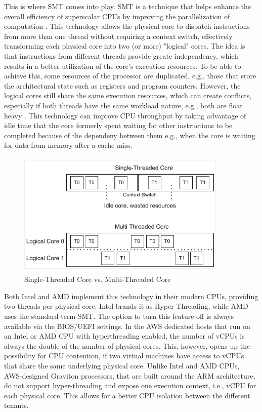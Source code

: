 \noindent
This is where \ac{SMT} comes into play. \acs{SMT} is a technique that helps enhance the overall efficiency of superscalar CPUs 
by improving the parallelization of computation \cite{wikipedia_hyperthreading}. This technology allows the 
physical core to dispatch instructions from more than one thread \cite{intel_hyperthreading} without requiring 
a context switch, effectively transforming each physical core into two (or more) "logical" cores. The idea is that instructions from different
threads provide greate independency, which results in a better utilization of the core's execution resources.
To be able to achieve this, some resources of the processor are duplicated, 
e.g., those that store the architectural state such as registers and program counters. However, the logical 
cores still share the same execution resources, which can create conflicts, especially if both threads have 
the same workload nature, e.g., both are float heavy \cite{wikipedia_hyperthreading}. This technology can 
improve CPU throughput by taking advantage of idle time that the core formerly spent waiting for other instructions 
to be completed because of the dependeny between them \cite{intel_hyperthreading} e.g., when the core is waiting for data from memory after a cache 
miss.
\begin{figure}[H]
    \centering
    \hspace*{-2cm} 
    \includegraphics[width=10cm, height=6cm]{figures/all.pdf}
    \caption{Single-Threaded Core vs. Multi-Threaded Core}
    \label{fig:all}
\end{figure}
\noindent
Both Intel and AMD implement this technology in their modern CPUs, providing two threads per physical core. 
Intel brands it as Hyper-Threading, while AMD uses the standard term \ac{SMT}. The option to turn this 
feature off is always available via the BIOS/UEFI settings. In the AWS dedicated hosts that run on an Intel or 
AMD CPU with hyperthreading enabled, the number of vCPUs is always the double of the number of physical cores. 
This, however, opens up the possibility for CPU contention, if two virtual machines have access to vCPUs that 
share the same underlying physical core. Unlike Intel and AMD CPUs, AWS-designed Graviton processors, that 
are built around the ARM architecture, do not support hyper-threading \cite{thorat2024graviton} and 
expose one execution context, i.e., vCPU for each physical core. This allows for a better CPU isolation 
between the different tenants. 

